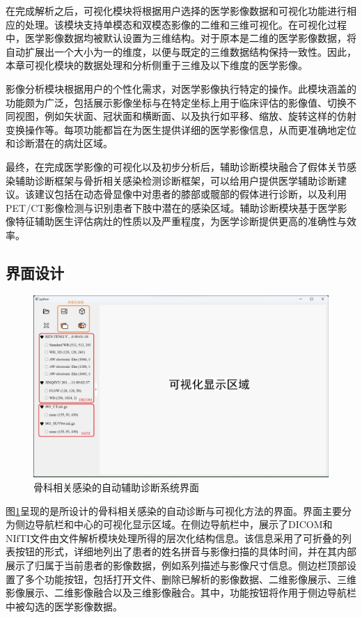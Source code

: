 在完成解析之后，可视化模块将根据用户选择的医学影像数据和可视化功能进行相应的处理。该模块支持单模态和双模态影像的二维和三维可视化。在可视化过程中，医学影像数据均被默认设置为三维结构。对于原本是二维的医学影像数据，将自动扩展出一个大小为一的维度，以便与既定的三维数据结构保持一致性。因此，本章可视化模块的数据处理和分析侧重于三维及以下维度的医学影像。

影像分析模块根据用户的个性化需求，对医学影像执行特定的操作。此模块涵盖的功能颇为广泛，包括展示影像坐标与在特定坐标上用于临床评估的影像值、切换不同视图，例如矢状面、冠状面和横断面、以及执行如平移、缩放、旋转这样的仿射变换操作等。每项功能都旨在为医生提供详细的医学影像信息，从而更准确地定位和诊断潜在的病灶区域。

最终，在完成医学影像的可视化以及初步分析后，辅助诊断模块融合了假体关节感染辅助诊断框架与骨折相关感染检测诊断框架，可以给用户提供医学辅助诊断建议。该建议包括在动态骨显像中对患者的膝部或髋部的假体进行诊断，以及利用PET/CT影像检测与识别患者下肢中潜在的感染区域。辅助诊断模块基于医学影像特征辅助医生评估病灶的性质以及严重程度，为医学诊断提供更高的准确性与效率。

\subsection{界面设计}

\begin{figure}[htbp]
  \centering
  \includegraphics[width=\textwidth]{figures/chap05_preview.jpg}
  \caption{骨科相关感染的自动辅助诊断系统界面}
  \label{fig:chap05_preview}
\end{figure}

图\ref{fig:chap05_preview}呈现的是所设计的骨科相关感染的自动诊断与可视化方法的界面。界面主要分为侧边导航栏和中心的可视化显示区域。在侧边导航栏中，展示了DICOM和NIfTI文件由文件解析模块处理所得的层次化结构信息。该信息采用了可折叠的列表按钮的形式，详细地列出了患者的姓名拼音与影像扫描的具体时间，并在其内部展示了归属于当前患者的影像数据，例如系列描述与影像尺寸信息。侧边栏顶部设置了多个功能按钮，包括打开文件、删除已解析的影像数据、二维影像展示、三维影像展示、二维影像融合以及三维影像融合。其中，功能按钮将作用于侧边导航栏中被勾选的医学影像数据。

